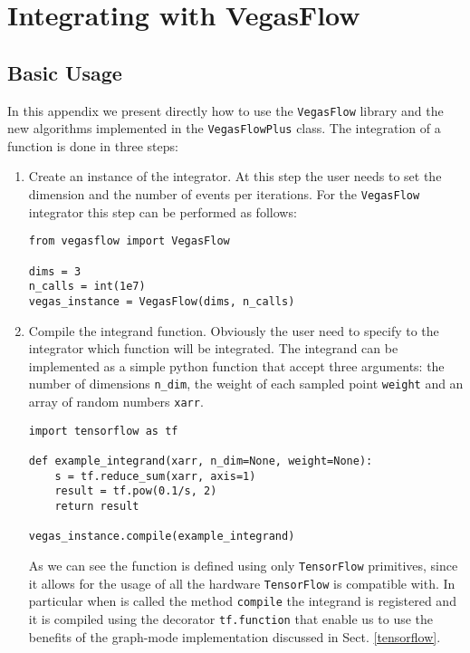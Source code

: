 \documentclass[../main/main.tex]{subfiles}
\begin{document}
\chapter{Integrating with VegasFlow}

\section{Basic Usage}
In this appendix we present directly how to use the \texttt{VegasFlow} library and the new algorithms implemented in the \texttt{VegasFlowPlus} class. The integration of a function is done in three steps:
\begin{enumerate}
	\item Create an instance of the integrator. At this step the user needs to set the dimension and the number of events per iterations. For the \texttt{VegasFlow} integrator this step can be performed as follows:
	\begin{verbatim}
from vegasflow import VegasFlow
		
dims = 3
n_calls = int(1e7)
vegas_instance = VegasFlow(dims, n_calls)
\end{verbatim}
\item Compile the integrand function. Obviously the user need to specify to the integrator which function will be integrated. The integrand can be implemented as a simple python function that accept three arguments: the number of dimensions \texttt{n\_dim}, the weight of each sampled point \texttt{weight} and an array of random numbers \texttt{xarr}.
\begin{verbatim}
import tensorflow as tf
	
def example_integrand(xarr, n_dim=None, weight=None):
	s = tf.reduce_sum(xarr, axis=1)
	result = tf.pow(0.1/s, 2)
	return result

vegas_instance.compile(example_integrand)
\end{verbatim}

As we can see the function is defined using only \texttt{TensorFlow} primitives, since it allows for the usage of all the hardware \texttt{TensorFlow} is compatible with. In particular when is called the method \texttt{compile} the integrand is registered and it is compiled using the decorator \texttt{tf.function} that enable us to use the benefits of the graph-mode implementation discussed in Sect. \ref{tensorflow}.


\end{enumerate}
\end{document}
